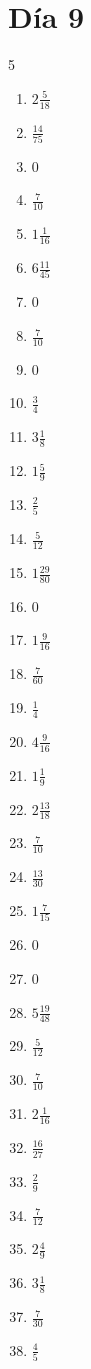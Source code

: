 \documentclass[12pt]{article}
\begin{document}
\section*{Día 9}
\begin{multicols}{5}\begin{enumerate}
\item $ 2 \frac{5}{18} $
\item $ \frac{14}{75} $
\item $ 0 $
\item $ \frac{7}{10} $
\item $ 1 \frac{1}{16} $
\item $ 6 \frac{11}{45} $
\item $ 0 $
\item $ \frac{7}{10} $
\item $ 0 $
\item $ \frac{3}{4} $
\item $ 3 \frac{1}{8} $
\item $ 1 \frac{5}{9} $
\item $ \frac{2}{5} $
\item $ \frac{5}{12} $
\item $ 1 \frac{29}{80} $
\item $ 0 $
\item $ 1 \frac{9}{16} $
\item $ \frac{7}{60} $
\item $ \frac{1}{4} $
\item $ 4 \frac{9}{16} $
\item $ 1 \frac{1}{9} $
\item $ 2 \frac{13}{18} $
\item $ \frac{7}{10} $
\item $ \frac{13}{30} $
\item $ 1 \frac{7}{15} $
\item $ 0 $
\item $ 0 $
\item $ 5 \frac{19}{48} $
\item $ \frac{5}{12} $
\item $ \frac{7}{10} $
\item $ 2 \frac{1}{16} $
\item $ \frac{16}{27} $
\item $ \frac{2}{9} $
\item $ \frac{7}{12} $
\item $ 2 \frac{4}{9} $
\item $ 3 \frac{1}{8} $
\item $ \frac{7}{30} $
\item $ \frac{4}{5} $

\end{enumerate}
\end{multicols}
\end{document}
